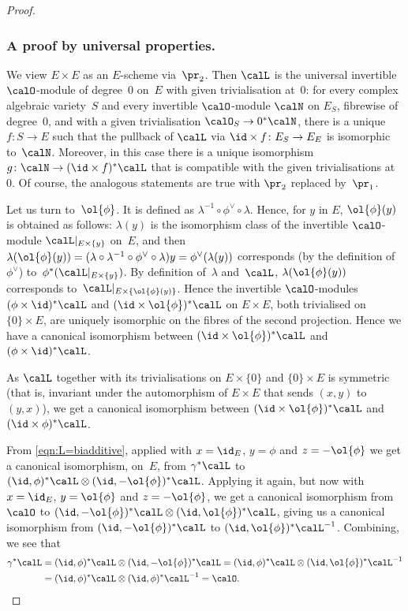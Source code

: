 \begin{proof}
\subsubsection*{A proof by universal properties.} We view
$E\times E$ as an $E$-scheme via~$\pr_2$. Then $\calL$ is the
universal invertible $\calO$-module of degree~$0$ on~$E$ with given
trivialisation at~$0$: for every complex algebraic variety~$S$ and
every invertible $\calO$-module $\calN$ on $E_S$, fibrewise of
degree~$0$, and with a given trivialisation $\calO_S\to 0^*\calN$,
there is a unique $f\colon S\to E$ such that the pullback of $\calL$
via $\id\times f\colon E_S\to E_E$ is isomorphic to~$\calN$. Moreover,
in this case there is a unique isomorphism $g\colon \calN\to
(\id\times f)^*\calL$ that is compatible with the given
trivialisations at~$0$. Of course, the analogous statements are true
with $\pr_2$ replaced by~$\pr_1$.

Let us turn to~$\ol{\phi}$. It is defined as
$\lambda^{-1}\circ\phi^\vee\circ\lambda$. Hence, for $y$ in $E$,
$\ol{\phi}(y)$ is obtained as follows: $\lambda(y)$ is the isomorphism
class of the invertible $\calO$-module $\calL|_{E\times\{y\}}$ on~$E$,
and then
$\lambda(\ol{\phi}(y))=
(\lambda\circ\lambda^{-1}\circ\phi^\vee\circ\lambda)y
=\phi^\vee(\lambda(y))$ corresponds (by the definition of~$\phi^\vee$)
to~$\phi^*(\calL|_{E\times\{y\}})$. By definition of~$\lambda$
and~$\calL$, $\lambda(\ol{\phi}(y))$ corresponds
to~$\calL|_{E\times\{\ol{\phi}(y)\}}$. Hence the invertible
$\calO$-modules $(\phi\times\id)^*\calL$ and
$(\id\times\ol{\phi})^*\calL$ on $E\times E$, both trivialised on
$\{0\}\times E$, are uniquely isomorphic on the fibres of the
second projection. Hence we have a canonical isomorphism
between $(\id\times\ol{\phi})^*\calL$ and $(\phi\times\id)^*\calL$.

As $\calL$ together with its trivialisations on $E\times\{0\}$ and
$\{0\}\times E$ is symmetric (that is, invariant under the
automorphism of $E\times E$ that sends $(x,y)$ to $(y,x)$), we get a
canonical isomorphism between $(\id\times\ol{\phi})^*\calL$ and
$(\id\times \phi)^*\calL$.

From \eqref{eqn:L=biadditive}, applied with $x=\id_E$, $y=\phi$ and
$z=-\ol{\phi}$ we get a canonical isomorphism, on~$E$, from
$\gamma^*\calL$ to
$(\id,\phi)^*\calL\otimes(\id,-\ol{\phi})^*\calL$. Applying it again,
but now with $x=\id_E$, $y=\ol{\phi}$ and $z=-\ol{\phi}$, we get a
canonical isomorphism from $\calO$ to
$(\id,-\ol{\phi})^*\calL\otimes(\id,\ol{\phi})^*\calL$, giving us a
canonical isomorphism from $(\id,-\ol{\phi})^*\calL$ to
$(\id,\ol{\phi})^*\calL^{-1}$. Combining, we see that
\begin{align*}
\gamma^*\calL & = (\id,\phi)^*\calL\otimes(\id,-\ol{\phi})^*\calL
= (\id,\phi)^*\calL\otimes(\id,\ol{\phi})^*\calL^{-1} \\
& = (\id,\phi)^*\calL\otimes(\id,\phi)^*\calL^{-1} = \calO.\qedhere
\end{align*}
\end{proof}

